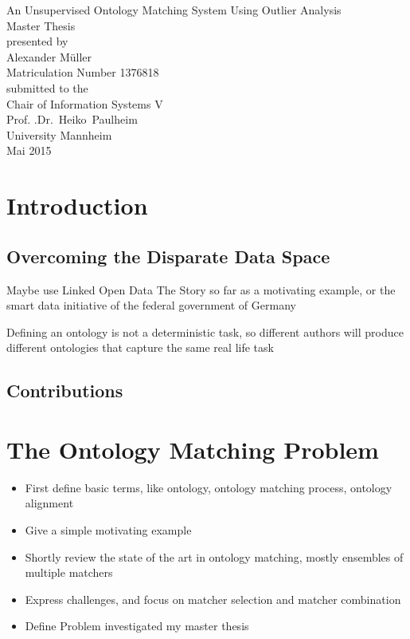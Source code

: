 \documentclass[11pt,titlepage,oneside,openany,a4paper]{report}
\begin{document}
\begin{titlepage}
	\vspace*{2cm}
  \begin{center}
   {\Large An Unsupervised Ontology Matching System Using Outlier Analysis \\}
   \vspace{2cm}
   {Master Thesis\\}
   \vspace{2cm}
   {presented by\\
 	 Alexander Müller \\
    Matriculation Number 1376818\\
   }
   \vspace{1cm}
   {submitted to the\\
  	Chair of Information Systems V\\
  	 Prof. .Dr.\ Heiko\ Paulheim \\
    University Mannheim\\} \vspace{2cm}
   {Mai 2015}
  \end{center}
\end{titlepage}
\tableofcontents
\newpage

\listoffigures

\listoftables

\newpage
{}
\chapter{Introduction}
	\section{Overcoming the Disparate Data Space}
	Maybe use Linked Open Data The Story so far as a motivating example, or the smart data initiative of the federal government of Germany
	
	Defining an ontology is not a deterministic task, so different authors will produce different ontologies that capture the same real life task
	\section{Contributions}

\chapter{The Ontology Matching Problem}
\label{chap:om_problem}
	\begin{itemize}
	\item First define basic terms, like ontology, ontology matching process, ontology alignment
	\item Give a simple motivating example
	\item Shortly review the state of the art in ontology matching, mostly ensembles of multiple matchers
	\item Express challenges, and focus on matcher selection and matcher combination
	\item Define Problem investigated my master thesis
	\end{itemize}
\end{document}
